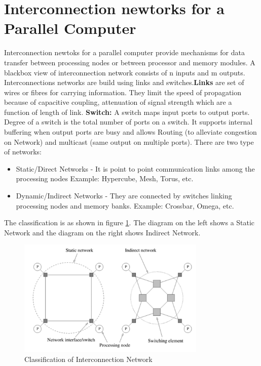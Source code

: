 \documentclass[12pt]{article}
\begin{document}
\section{Interconnection newtorks for a Parallel Computer}
Interconnection newtoks for a parallel computer provide mechanisms for data transfer between processing nodes or between
processor and memory modules. A blackbox view of interconnection network consists of n inputs and m outputs. Interconnections networks are build using links and switches.\textbf{Links} are set of wires 
or fibres for carrying information. They limit the speed of propagation because of capacitive coupling, attenuation of signal strength 
which are a function of length of link. \textbf{Switch: }A switch maps input ports to output ports. Degree of a switch is the total number of ports on a switch.
It supports internal buffering when output ports are busy and allows Routing (to alleviate congestion on Network) and 
multicast (same output on multiple ports). There are two type of networks:
\begin{itemize}
    \item Static/Direct Networks - It is point to point communication links among the processing nodes Example: Hypercube, Mesh, Torus, etc.
    \item Dynamic/Indirect Networks - They are connected by switches linking processing nodes and memory banks. Example: Crossbar, Omega, etc.
\end{itemize}
The classification is as shown in figure \ref{fig:class_network}. The diagram on the left shows a Static Network and the diagram on the right shows Indirect Network.
\begin{figure}[H]
    \centering
    \includegraphics[width=0.8\textwidth]{images/class_network.png}
    \caption{Classification of Interconnection Network}
    \label{fig:class_network}
\end{figure}
\end{document}
